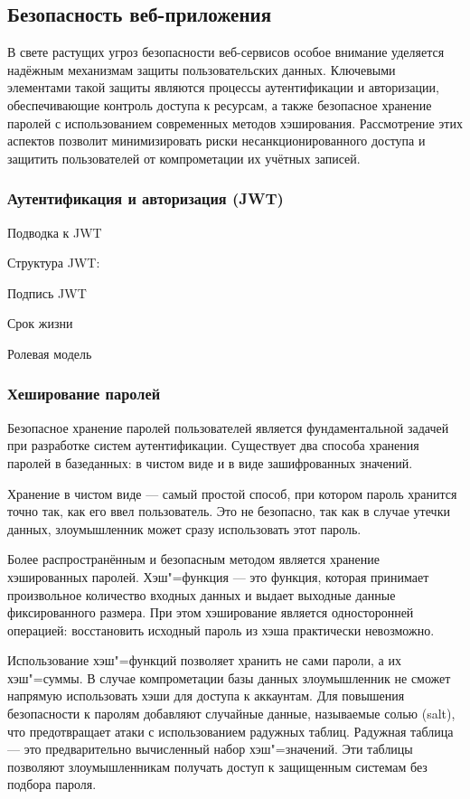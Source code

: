 \subsection{Безопасность веб-приложения}

В свете растущих угроз безопасности веб-сервисов особое внимание уделяется надёжным механизмам защиты пользовательских данных. Ключевыми элементами такой защиты являются процессы аутентификации и авторизации, обеспечивающие контроль доступа к ресурсам, а также безопасное хранение паролей с использованием современных методов хэширования. Рассмотрение этих аспектов позволит минимизировать риски несанкционированного доступа и защитить пользователей от компрометации их учётных записей.

\subsubsection{Аутентификация и авторизация (JWT)}

Подводка к JWT

Структура JWT:

Подпись JWT

Срок жизни

Ролевая модель

\subsubsection{Хеширование паролей}

Безопасное хранение паролей пользователей является фундаментальной задачей при разработке систем аутентификации. Существует два способа хранения паролей в базеданных: в чистом виде и в виде зашифрованных значений. 

Хранение в чистом виде --- самый простой способ, при котором пароль хранится точно так, как его ввел пользователь. Это не безопасно, так как в случае утечки данных, злоумышленник может сразу использовать этот пароль.

Более распространённым и безопасным методом является хранение хэшированных паролей. Хэш"=функция --- это функция, которая принимает произвольное количество входных данных и выдает выходные данные фиксированного размера. При этом хэширование является односторонней операцией: восстановить исходный пароль из хэша практически невозможно.

Использование хэш"=функций позволяет хранить не сами пароли, а их хэш"=суммы. В случае компрометации базы данных злоумышленник не сможет напрямую использовать хэши для доступа к аккаунтам. Для повышения безопасности к паролям добавляют случайные данные, называемые солью (salt), что предотвращает атаки с использованием радужных таблиц. Радужная таблица --- это предварительно вычисленный набор хэш"=значений. Эти таблицы позволяют злоумышленникам получать доступ к защищенным системам без подбора пароля.

